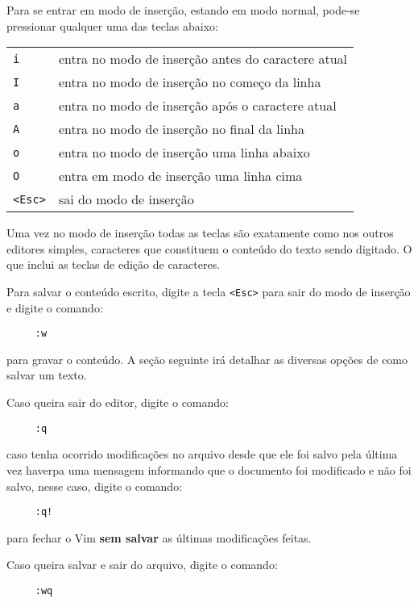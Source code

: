 Para se entrar em modo de inserção, estando em modo normal, pode-se pressionar 
qualquer uma das teclas abaixo:
\begin{table}[htb]\begin{center} \begin{tabular}{ll} \hline
     \verb|i| & entra no modo de inserção antes do caractere atual \\
     \verb|I| & entra no modo de inserção no começo da linha \\
     \verb|a| & entra no modo de inserção após o caractere atual \\
     \verb|A| & entra no modo de inserção no final da linha \\
     \verb|o| & entra no modo de inserção uma linha abaixo \\
     \verb|O| & entra em modo de inserção uma linha cima \\
     \verb|<Esc>| & sai do modo de inserção \\
\hline \end{tabular}\end{center}\end{table}

Uma vez no modo de inserção todas as teclas são exatamente 
como nos outros editores simples, caracteres que constituem o conteúdo do texto 
sendo digitado. 
O que inclui as teclas de edição de caracteres.

Para salvar o conteúdo escrito, digite a tecla \verb|<Esc>| para 
sair do modo de inserção e digite o comando:
\begin{verbatim}
     :w 
\end{verbatim}
para gravar o conteúdo. A seção seguinte irá detalhar as diversas opções de como salvar um texto.

Caso queira sair do editor, digite o comando:
\begin{verbatim}
     :q
\end{verbatim}
caso tenha ocorrido modificações no arquivo desde que ele foi salvo pela última vez
haverpa uma mensagem informando que o documento foi modificado e não foi salvo,
 nesse caso, digite o comando: 
\begin{verbatim}
     :q! 
\end{verbatim}
para fechar o Vim {\bf sem salvar} as últimas modificações feitas.

Caso queira salvar e sair do arquivo, digite o comando:
\begin{verbatim}
     :wq
\end{verbatim}

